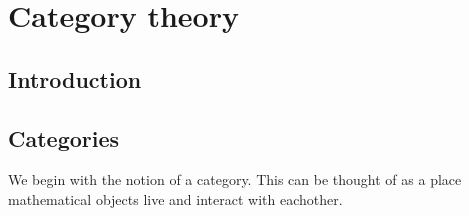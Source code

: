 \newcommand{\Ob}[1]{\text{Ob}(#1)}
\newcommand{\mc}[1]{\mathcal{#1}}

\section{Category theory}

\subsection{Introduction}




\subsection{Categories}

We begin with the notion of a category. This can be thought of as a place mathematical objects live and interact with eachother.

